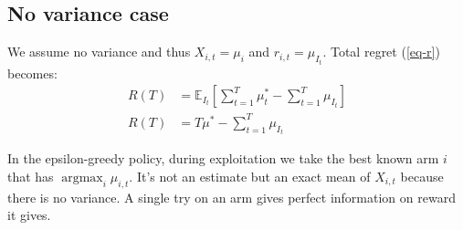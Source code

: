 \documentclass[12pt,english]{article}
\DeclareMathOperator*{\argmax}{argmax}
\begin{document}
\subsection{No variance case}
We assume no variance and thus \(X_{i,t} = \mu_i\) and \(r_{i,t} = \mu_{I_t}\). Total regret (\ref{eq-r}) becomes:
\begin{align}\label{eq-r-novar}
	R\left( T \right) &= \mathbb{E}_{I_t} \left[ \sum_{t=1}^{T} \mu_t^* - \sum_{t=1}^T \mu_{I_t} \right] \\
	R\left( T \right) &= T \mu^{\ast} - \sum_{t=1}^T \mu_{I_t}
\end{align}

In the epsilon-greedy policy, during exploitation we take the best known arm \(i\) that has \(\argmax_{i}	\hat{\mu}_{i,t}\). It's not an estimate but an exact mean of \(X_{i,t}\) because there is no variance. A single try on an arm gives perfect information on reward it gives.
\end{document}
